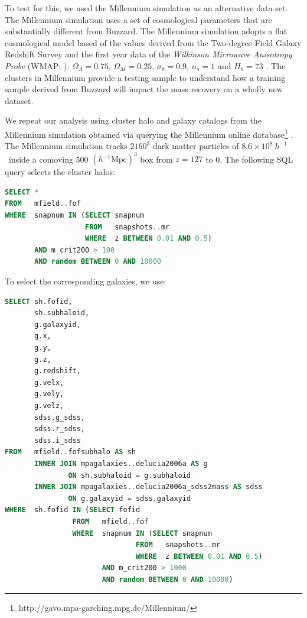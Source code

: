 \documentclass[fleqn,usenatbib]{mnras}
\begin{document}
To test for this, we used the Millennium simulation as an alternative data set. The Millennium simulation uses a set of cosmological parameters that are substantially different from Buzzard. The Millennium simulation adopts a flat cosmological model based of the values derived from the Two-degree Field Galaxy Redshift Survey \citep{Colless2001} and the first year data of the \emph{Wilkinson Microwave Anisotropy Probe} (WMAP; \citealt{Spergel2003}): $\Omega_\Lambda = 0.75$, $\Omega_M = 0.25$, $\sigma_8 = 0.9$, $n_s = 1$ and $H_0= 73$ \kms \mpc. The clusters in Millennium provide a testing sample to understand how a training sample derived from Buzzard will impact the mass recovery on a wholly new dataset. 

We repeat our analysis using cluster halo and galaxy catalogs from the Millennium simulation \citep{Springel2005a} obtained via querying the Millennium online database\footnote{http://gavo.mpa-garching.mpg.de/Millennium/} \citep{Lemson2006}. The Millennium simulation tracks $2160^3$ dark matter particles of $8.6\times 10^8 ~h^{-1}$ \Msol\ inside a comoving 500 $(h^{-1} \mathrm{Mpc})^3$ box from $z=127$ to 0. The following SQL query selects the cluster halos:
\begin{lstlisting}[language=SQL]
SELECT * 
FROM   mfield..fof 
WHERE  snapnum IN (SELECT snapnum 
                   FROM   snapshots..mr 
                   WHERE  z BETWEEN 0.01 AND 0.5) 
       AND m_crit200 > 100 
       AND random BETWEEN 0 AND 10000 
\end{lstlisting}
To select the corresponding galaxies, we use:
\begin{lstlisting}[language=SQL, breaklines=true]
SELECT sh.fofid, 
       sh.subhaloid, 
       g.galaxyid, 
       g.x, 
       g.y, 
       g.z, 
       g.redshift, 
       g.velx, 
       g.vely, 
       g.velz, 
       sdss.g_sdss, 
       sdss.r_sdss, 
       sdss.i_sdss 
FROM   mfield..fofsubhalo AS sh 
       INNER JOIN mpagalaxies..delucia2006a AS g 
               ON sh.subhaloid = g.subhaloid 
       INNER JOIN mpagalaxies..delucia2006a_sdss2mass AS sdss 
               ON g.galaxyid = sdss.galaxyid 
WHERE  sh.fofid IN (SELECT fofid 
                FROM   mfield..fof 
                WHERE  snapnum IN (SELECT snapnum 
                               FROM   snapshots..mr 
                               WHERE  z BETWEEN 0.01 AND 0.5) 
                       AND m_crit200 > 1000 
                       AND random BETWEEN 0 AND 10000) 
\end{lstlisting}
\end{document}
